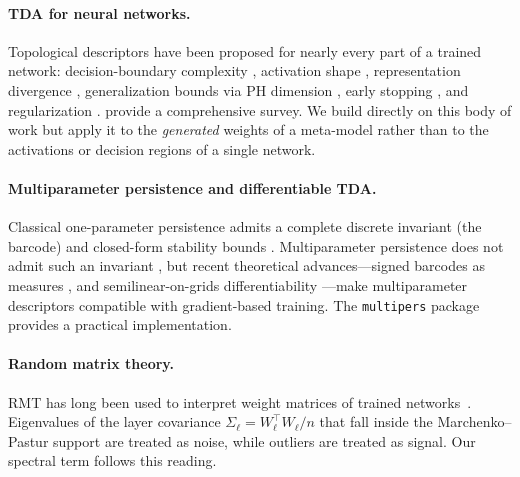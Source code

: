 \documentclass{article}
\begin{document}
\paragraph{TDA for neural networks.}
Topological descriptors have been proposed for nearly every part of a
trained network: decision-boundary complexity
\citep{TopologicalDataAnalysis,liFindingHomologyDecision2020},
activation shape \citep{naitzatTopologyDeepNeural2020,gebhartCharacterizingShapeActivation2019},
representation divergence \citep{barannikovRepresentationTopologyDivergence2022},
generalization bounds via PH dimension
\citep{birdalIntrinsicDimensionPersistent2021},
early stopping \citep{rieckNeuralPersistenceComplexity2018}, and
regularization \citep{chenTopologicalRegularizerClassifiers2018}.
\citet{ballesterTopologicalDataAnalysis2024} provide a comprehensive survey.
We build directly on this body of work but apply it to the \emph{generated}
weights of a meta-model rather than to the activations or decision regions
of a single network.

\paragraph{Multiparameter persistence and differentiable TDA.}
Classical one-parameter persistence admits a complete discrete invariant
(the barcode) and closed-form stability bounds
\citep{oudotAlgebraicIntroductionPersistence2026}.  Multiparameter
persistence does not admit such an invariant
\citep{carlssonTheoryMultidimensionalPersistence2009}, but recent
theoretical advances---signed barcodes as measures
\citep{loiseauxStableVectorizationMultiparameter2024a,loiseauxFrameworkFastStable2023,loiseauxMultiparameterModuleApproximation2022},
and semilinear-on-grids differentiability
\citep{scoccolaDifferentiabilityOptimizationMultiparameter2024}---make
multiparameter descriptors compatible with gradient-based training.
The \texttt{multipers} package \citep{loiseauxStableVectorizationMultiparameter2024a}
provides a practical implementation.

\paragraph{Random matrix theory.}
RMT has long been used to interpret weight matrices of trained
networks~\citep{bahriStatisticalMechanicsDeep2020}.  Eigenvalues of the
layer covariance $\Sigma_\ell = W_\ell^\top W_\ell / n$ that fall inside
the Marchenko--Pastur support are treated as noise, while outliers are
treated as signal.  Our spectral term follows this reading.
\end{document}
